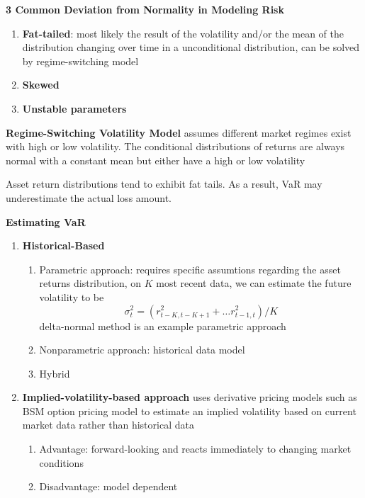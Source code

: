 \documentclass[11pt,fleqn]{report} %
\numberwithin{equation}{section} %
\numberwithin{figure}{section} %
\numberwithin{table}{section} %
\begin{document}
\begin{definition}\textbf{3 Common Deviation from Normality in Modeling Risk}
\begin{enumerate}
    \item \textbf{Fat-tailed}: most likely the result of the volatility and/or the mean of the distribution changing over time in a unconditional distribution, can be solved by regime-switching model
    \item \textbf{Skewed}
    \item \textbf{Unstable parameters}
\end{enumerate}
\end{definition}
\begin{definition}\textbf{Regime-Switching Volatility Model} assumes different market regimes exist with high or low volatility. The conditional distributions of returns are always normal with a constant mean but either have a high or low volatility
\end{definition}
\begin{remark}
Asset return distributions tend to exhibit fat tails. As a result, VaR may underestimate the actual loss amount.
\end{remark}
\begin{definition}\textbf{Estimating VaR}
\begin{enumerate}
    \item \textbf{Historical-Based}
    \begin{enumerate}
        \item Parametric approach: requires specific assumtions regarding the asset returns distribution, on $K$ most recent data, we can estimate the future volatility to be
        $$
        \sigma_t^2=\left(r_{t-K,t-K+1}^2+\dots r_{t-1,t}^2\right)/K
        $$
        delta-normal method is an example parametric approach
        \item Nonparametric approach: historical data model
        \item Hybrid
    \end{enumerate}
    \item \textbf{Implied-volatility-based approach} uses derivative pricing models such as BSM option pricing model to estimate an implied volatility based on current market data rather than historical data
    \begin{enumerate}
        \item Advantage: forward-looking and reacts immediately to changing market conditions
        \item Disadvantage: model dependent
    \end{enumerate}
\end{enumerate}
\end{definition}
\end{document}

